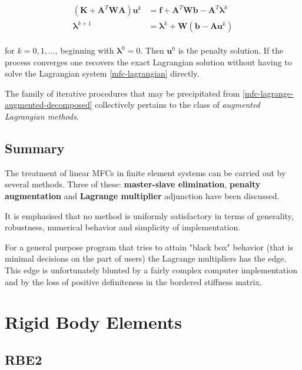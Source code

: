 \documentclass[10pt,b5paper,titlepage]{book}
\newcommand{\m}{\mathbf}
\newcommand{\M}{\pmb}
\newenvironment{eqarray}
{
    \begin{eqnarray}
        \begin{aligned}
}
{
        \end{aligned}
    \end{eqnarray}
}
\begin{document}
\begin{eqarray}\label{mfc-lagrange-augmented-iteration}
    \left( \m{K} + \m{A}^T \m{W} \m{A} \right) \m{u}^k
    &= \m{f} + \m{A}^T \m{W} \m{b} - \m{A}^T \M{\lambda}^k \\
    \M{\lambda}^{k+1} &= \M{\lambda}^k + \m{W} \left(\m{b} - \m{A} \m{u}^k \right)
\end{eqarray}

for $ k = 0, 1, \dots $, beginning with $ \M{\lambda}^0 = 0 $. Then $ \m{u}^0 $
is the penalty solution. If the process converges one recovers the exact Lagrangian
solution without having to solve the Lagrangian system \eqref{mfc-lagrangian}
directly.

The family of iterative procedures that may be precipitated from
\eqref{mfc-lagrange-augmented-decomposed} collectively pertains to the class of
\textit{augmented Lagrangian methods}.


\section{Summary}

The treatment of linear MFCs in finite element systems can be carried out by
several methods. Three of these: \textbf{master-slave elimination},
\textbf{penalty augmentation} and \textbf{Lagrange multiplier} adjunction
have been discussed.

It is emphasised that no method is uniformly satisfactory in terms of generality,
robustness, numerical behavior and simplicity of implementation.

For a general purpose program that tries to attain "black box" behavior
(that is minimal decisions on the part of users) the Lagrange multipliers has
the edge. This edge is unfortunately blunted by a fairly complex computer
implementation and by the loss of positive definiteness in the bordered stiffness
matrix.


\newpage
\chapter{Rigid Body Elements}

\section{RBE2}
\end{document}

